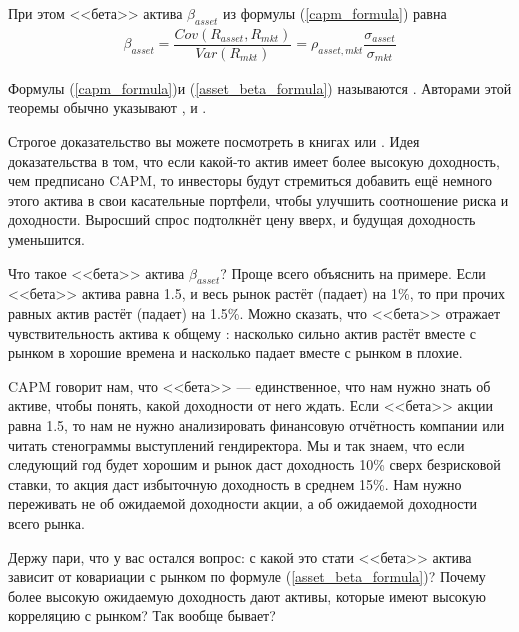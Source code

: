 При этом <<бета>> актива $\beta_{asset}$ из формулы (\ref{capm_formula}) равна
\begin{align}
\beta_{asset} = \dfrac{Cov(R_{asset}, R_{mkt})}{Var(R_{mkt})}
= \rho_{asset,mkt}\dfrac{\sigma_{asset}}{\sigma_{mkt}}
\label{asset_beta_formula}
\end{align}

Формулы (\ref{capm_formula})и (\ref{asset_beta_formula}) называются 
. 
Авторами этой теоремы обычно указывают 
\cite{sharpe1964capital},  
\cite{lintner1965valuation} и  
\cite{mossin1966equilibrium}.

Строгое доказательство вы можете посмотреть в книгах \cite[ch.~9.1]
{cochrane2005asset} или \cite[ch.~9.1]{bodie2014investments}. Идея 
доказательства в том, что если какой-то актив имеет более высокую доходность, 
чем предписано CAPM, то инвесторы будут стремиться добавить ещё немного этого 
актива в свои касательные портфели, чтобы улучшить соотношение риска и 
доходности. Выросший спрос подтолкнёт цену вверх, и будущая доходность 
уменьшится.

Что такое <<бета>> актива $\beta_{asset}$? Проще всего объяснить на примере. 
Если <<бета>> актива равна 1.5, и весь рынок растёт (падает) на 1\%, то при 
прочих равных актив растёт (падает) на 1.5\%. Можно сказать, что <<бета>> 
отражает чувствительность актива к общему : 
насколько сильно актив растёт вместе с рынком в хорошие времена и насколько 
падает вместе с рынком в плохие.

CAPM говорит нам, что <<бета>> --- единственное, что нам нужно знать об активе, 
чтобы понять, какой доходности от него ждать. Если <<бета>> акции равна 1.5, то 
нам не нужно анализировать финансовую отчётность компании или читать стенограммы 
выступлений гендиректора. Мы и так знаем, что если следующий год будет хорошим и 
рынок даст доходность 10\% сверх безрисковой ставки, то акция даст избыточную 
доходность в среднем 15\%. Нам нужно переживать не об ожидаемой доходности 
акции, а об ожидаемой доходности всего рынка.

Держу пари, что у вас остался вопрос: с какой это стати <<бета>> актива зависит 
от ковариации с рынком по формуле (\ref{asset_beta_formula})? Почему более 
высокую ожидаемую доходность дают активы, которые имеют высокую корреляцию с 
рынком? Так вообще бывает?

